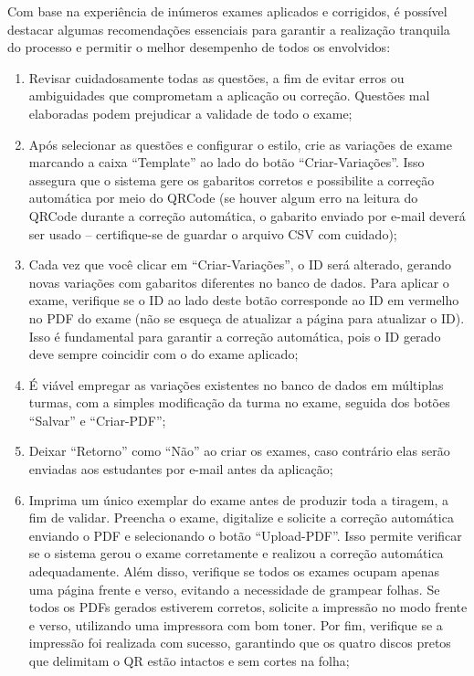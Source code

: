Com base na experiência de inúmeros exames aplicados e corrigidos, é possível destacar algumas recomendações essenciais para garantir a realização tranquila do processo e permitir o melhor desempenho de todos os envolvidos:

\begin{enumerate}
    \item Revisar cuidadosamente todas as questões, a fim de evitar erros ou ambiguidades que comprometam a aplicação ou correção. Questões mal elaboradas podem prejudicar a validade de todo o exame;
    \item Após selecionar as questões e configurar o estilo, crie as variações de exame marcando a caixa ``Template'' ao lado do botão ``Criar-Variações''. Isso assegura que o sistema gere os gabaritos corretos e possibilite a correção automática por meio do QRCode (se houver algum erro na leitura do QRCode durante a correção automática, o gabarito enviado por e-mail deverá ser usado -- certifique-se de guardar o arquivo CSV com cuidado);
    \item Cada vez que você clicar em ``Criar-Variações'', o ID será alterado, gerando novas variações com gabaritos diferentes no banco de dados. Para aplicar o exame, verifique se o ID ao lado deste botão corresponde ao ID em vermelho no PDF do exame (não se esqueça de atualizar a página para atualizar o ID). Isso é fundamental para garantir a correção automática, pois o ID gerado deve sempre coincidir com o do exame aplicado;
    \item É viável empregar as variações existentes no banco de dados em múltiplas turmas, com a simples modificação da turma no exame, seguida dos botões ``Salvar'' e ``Criar-PDF'';
    \item Deixar ``Retorno'' como ``Não'' ao criar os exames, caso contrário elas serão enviadas aos estudantes por e-mail antes da aplicação;
    \item Imprima um único exemplar do exame antes de produzir toda a tiragem, a fim de validar. Preencha o exame, digitalize e solicite a correção automática enviando o PDF e selecionando o botão ``Upload-PDF''. Isso permite verificar se o sistema gerou o exame corretamente e realizou a correção automática adequadamente. Além disso, verifique se todos os exames ocupam apenas uma página frente e verso, evitando a necessidade de grampear folhas. Se todos os PDFs gerados estiverem corretos, solicite a impressão no modo frente e verso, utilizando uma impressora com bom toner. Por fim, verifique se a impressão foi realizada com sucesso, garantindo que os quatro discos pretos que delimitam o QR estão intactos e sem cortes na folha;

\end{enumerate}
